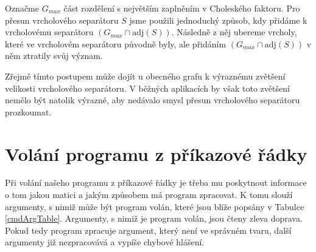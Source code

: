 \documentclass[11pt,american,czech,oneside]{book}
\theoremstyle{plain}
\theoremstyle{definition}
\begin{document}
Označme $G_{max}$ část rozdělení s největším zaplněním v Choleského faktoru. Pro přesun vrcholového separátoru $S$ jsme použili jednoduchý způsob, kdy přidáme k vrcholovému separátoru $(G_{max} \cap\mathrm{adj}(S))$. Následně z něj ubereme vrcholy, které ve vrcholovém separátoru původně byly, ale přidáním $(G_{max} \cap\mathrm{adj}(S))$ v něm ztratily svůj význam.

Zřejmě tímto postupem může dojít u obecného grafu k výraznému zvětšení velikosti vrcholového separátoru. V běžných aplikacích by však toto zvětšení nemělo být natolik výrazné, aby nedávalo smysl přesun vrcholového separátoru prozkoumat.


\section{Volání programu z příkazové řádky}
\label{cmdlineSection}

Při volání našeho programu z příkazové řádky je třeba mu poskytnout informace o tom jakou matici a jakým způsobem má program zpracovat. K tomu slouží argumenty, s nimiž může být program volán, které jsou blíže popsány v Tabulce \ref{cmdArgTable}. Argumenty, s nimiž je program volán, jsou čteny zleva doprava. Pokud tedy program zpracuje argument, který není ve správném tvaru, další argumenty již nezpracovává a vypíše chybové hlášení.
\end{document}
